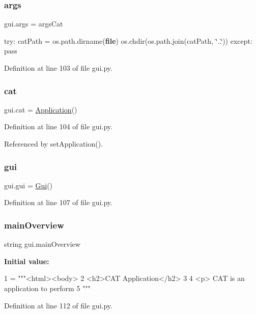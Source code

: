 \subsubsection{\texorpdfstring{args}{args}}
{\footnotesize\ttfamily gui.\+args = args\+Cat}



try\+: cat\+Path = os.\+path.\+dirname({\bfseries file}) os.\+chdir(os.\+path.\+join(cat\+Path, \char`\"{}..\char`\"{})) except\+: pass 



Definition at line 103 of file gui.\+py.

\mbox{\label{namespacegui_a3a26ff3a3c51b7dea987a548f1ca8109}} 
\subsubsection{\texorpdfstring{cat}{cat}}
{\footnotesize\ttfamily gui.\+cat = \hyperlink{classApplication}{Application}()}



Definition at line 104 of file gui.\+py.



Referenced by set\+Application().

\mbox{\label{namespacegui_a6de765688c7629408f05477a6ffa24b7}} 
\subsubsection{\texorpdfstring{gui}{gui}}
{\footnotesize\ttfamily gui.\+gui = \hyperlink{classgui_1_1Gui}{Gui}()}



Definition at line 107 of file gui.\+py.

\mbox{\label{namespacegui_ab89eb8f7c2d459b1cde0cd06cdc5cfd3}} 
\subsubsection{\texorpdfstring{main\+Overview}{mainOverview}}
{\footnotesize\ttfamily string gui.\+main\+Overview}

{\bfseries Initial value\+:}
\begin{DoxyCode}
1 =  \textcolor{stringliteral}{"""<html><body>}
2 \textcolor{stringliteral}{<h2>CAT Application</h2>}
3 \textcolor{stringliteral}{}
4 \textcolor{stringliteral}{<p> CAT is an application to perform}
5 \textcolor{stringliteral}{"""}
\end{DoxyCode}


Definition at line 112 of file gui.\+py.

